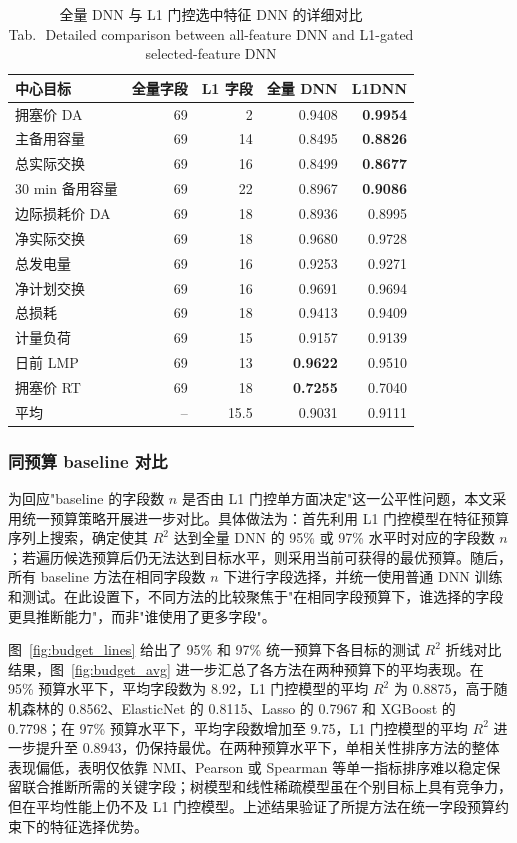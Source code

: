 \documentclass[UTF8,zihao=5,twoside]{ctexart}
\numberwithin{equation}{section}
\newcommand{\tabbicaption}[2]{%
  \caption{#1\\[-0.2em]\small Tab.\,\thetable\ #2}
}
\begin{document}
\begin{table}[!tbp]
\centering
\scriptsize
\setlength{\tabcolsep}{2pt}
\tabbicaption{全量 DNN 与 L1 门控选中特征 DNN 的详细对比}{Detailed comparison between all-feature DNN and L1-gated selected-feature DNN}
\label{tab:dnn_l1_compare}
\begin{tabularx}{\columnwidth}{Xrrrr}
\toprule
中心目标 & 全量字段 & L1 字段 & 全量 DNN & L1DNN \\
\midrule
拥塞价 DA & 69 & 2 & 0.9408 & \textbf{0.9954} \\
主备用容量 & 69 & 14 & 0.8495 & \textbf{0.8826} \\
总实际交换 & 69 & 16 & 0.8499 & \textbf{0.8677} \\
30 min 备用容量 & 69 & 22 & 0.8967 & \textbf{0.9086} \\
边际损耗价 DA & 69 & 18 & 0.8936 & 0.8995 \\
净实际交换 & 69 & 18 & 0.9680 & 0.9728 \\
总发电量 & 69 & 16 & 0.9253 & 0.9271 \\
净计划交换 & 69 & 16 & 0.9691 & 0.9694 \\
总损耗 & 69 & 18 & 0.9413 & 0.9409 \\
计量负荷 & 69 & 15 & 0.9157 & 0.9139 \\
日前 LMP & 69 & 13 & \textbf{0.9622} & 0.9510 \\
拥塞价 RT & 69 & 18 & \textbf{0.7255} & 0.7040 \\
\midrule
平均 & -- & 15.5 & 0.9031 & 0.9111 \\
\bottomrule
\end{tabularx}
\end{table}

\subsubsection{同预算 baseline 对比}
为回应"baseline 的字段数 $n$ 是否由 L1 门控单方面决定"这一公平性问题，本文采用统一预算策略开展进一步对比。具体做法为：首先利用 L1 门控模型在特征预算序列上搜索，确定使其 $R^2$ 达到全量 DNN 的 95\% 或 97\% 水平时对应的字段数 $n$；若遍历候选预算后仍无法达到目标水平，则采用当前可获得的最优预算。随后，所有 baseline 方法在相同字段数 $n$ 下进行字段选择，并统一使用普通 DNN 训练和测试。在此设置下，不同方法的比较聚焦于"在相同字段预算下，谁选择的字段更具推断能力"，而非"谁使用了更多字段"。

图~\ref{fig:budget_lines} 给出了 95\% 和 97\% 统一预算下各目标的测试 $R^2$ 折线对比结果，图~\ref{fig:budget_avg} 进一步汇总了各方法在两种预算下的平均表现。在 95\% 预算水平下，平均字段数为 8.92，L1 门控模型的平均 $R^2$ 为 0.8875，高于随机森林的 0.8562、ElasticNet 的 0.8115、Lasso 的 0.7967 和 XGBoost 的 0.7798；在 97\% 预算水平下，平均字段数增加至 9.75，L1 门控模型的平均 $R^2$ 进一步提升至 0.8943，仍保持最优。在两种预算水平下，单相关性排序方法的整体表现偏低，表明仅依靠 NMI、Pearson 或 Spearman 等单一指标排序难以稳定保留联合推断所需的关键字段；树模型和线性稀疏模型虽在个别目标上具有竞争力，但在平均性能上仍不及 L1 门控模型。上述结果验证了所提方法在统一字段预算约束下的特征选择优势。
\end{document}
